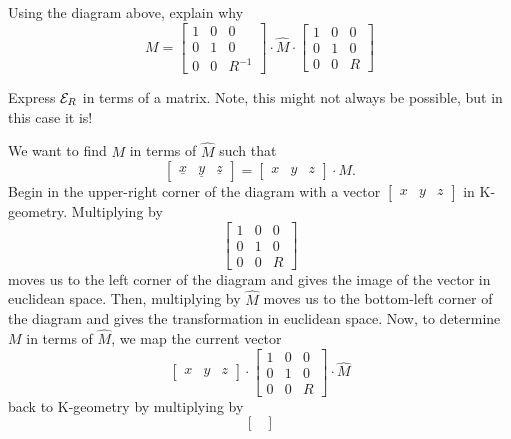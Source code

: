 \documentclass[newpage,hints,handout,noauthor,nooutcomes,12pt]{ximera}
\begin{document}
\begin{problem}
Using the diagram above, explain why%
\[
M
=\begin{bmatrix}
1 & 0 & 0\\
0 & 1 & 0\\
0 & 0 & R^{-1}
\end{bmatrix}
  \cdot\hat{M}\cdot\begin{bmatrix}
%
1 & 0 & 0\\
0 & 1 & 0\\
0 & 0 & R
\end{bmatrix}
\]
\begin{hint}
  Express $\mathcal{E}_R$ in terms of a matrix. Note, this might not always be
  possible, but in this case it is!
\end{hint}

\begin{freeResponse}
We want to find $M$ in terms of $\hat{M}$ such that 
\[
\begin{bmatrix}
\underline{x} & \underline{y} & \underline{z}%
\end{bmatrix}
=\begin{bmatrix}
x & y & z
\end{bmatrix}
\cdot M.
\]
Begin in the upper-right corner of the diagram with a vector
$\begin{bmatrix}
x & y & z
\end{bmatrix}
$ in K-geometry. Multiplying by 
\[
\begin{bmatrix}
1 & 0 & 0\\
0 & 1 & 0\\
0 & 0 & R
\end{bmatrix}
\]
moves us to the left corner of the diagram and gives the image of the
vector in euclidean space. Then, multiplying by $\hat{M}$ moves us to
the bottom-left corner of the diagram and gives the transformation in
euclidean space. Now, to determine $M$ in terms of $\hat{M}$, we map
the current vector
\[
\begin{bmatrix}
x & y & z
\end{bmatrix}
  \cdot\begin{bmatrix}
%
1 & 0 & 0\\
0 & 1 & 0\\
0 & 0 & R
\end{bmatrix}
  \cdot\hat{M}
  \]
back to K-geometry by multiplying by 
\[
\begin{bmatrix}

\end{bmatrix}\]
\end{freeResponse}
\end{problem}
\end{document}

